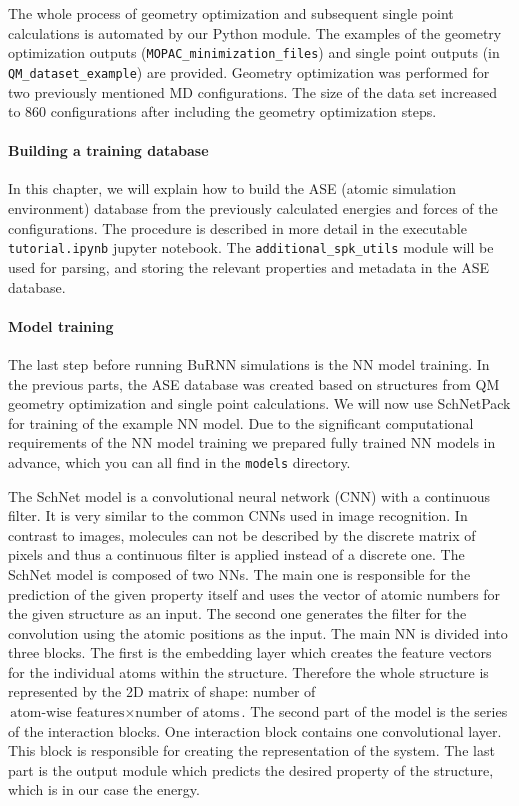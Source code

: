 The whole process of geometry optimization and subsequent single point calculations is automated by our Python module. The examples of the geometry optimization outputs (\texttt{MOPAC\_minimization\_files}) and single point outputs (in \texttt{QM\_dataset\_example}) are provided. Geometry optimization was performed for two previously mentioned MD configurations. The size of the data set increased to 860 configurations after including the geometry optimization steps.


\paragraph{Building a training database}
In this chapter, we will explain how to build the ASE (atomic simulation environment) \cite{Larsen2017ASE} database from the previously calculated energies and forces of the configurations. The procedure is described in more detail in the executable \texttt{tutorial.ipynb} jupyter notebook. The \texttt{additional\_spk\_utils} module will be used for parsing, and storing the relevant properties and metadata in the ASE database. 


\paragraph{Model training}
The last step before running BuRNN simulations is the NN model training. In the previous parts, the ASE database was created based on structures from QM geometry optimization and single point calculations. We will now use SchNetPack for training of the example NN model. Due to the significant computational requirements of the NN model training we prepared fully trained NN models in advance, which you can all find in the \texttt{models} directory. 


The SchNet model \cite{Schuett2018SchNet} is a convolutional neural network (CNN) with a continuous filter. It is very similar to the common CNNs used in image recognition. In contrast to images, molecules can not be described by the discrete matrix of pixels and thus a continuous filter is applied instead of a discrete one. The SchNet model is composed of two NNs. The main one is responsible for the prediction of the given property itself and uses the vector of atomic numbers for the given structure as an input. The second one generates the filter for the convolution using the atomic positions as the input. The main NN is divided into three blocks. The first is the embedding layer which creates the feature vectors for the individual atoms within the structure. Therefore the whole structure is represented by the 2D matrix of shape: number of $\text{atom-wise features}\times \text{number of atoms}$. The second part of the model is the series of the interaction blocks. One interaction block contains one convolutional layer. This block is responsible for creating the representation of the system. The last part is the output module which predicts the desired property of the structure, which is in our case the energy.

